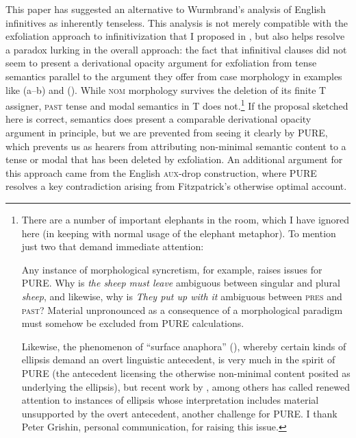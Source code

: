 \documentclass[output=paper]{langscibook}
\begin{document}
This paper has suggested an alternative to Wurmbrand's \citeyearpar{Wurmbrand:2014aa} analysis of English infinitives as inherently tenseless. This analysis is not merely compatible with the exfoliation approach to infinitivization that I proposed in \citet{Pesetsky:2019aa}, but also helps resolve a paradox lurking in the overall approach: the fact that infinitival clauses did not seem to present a derivational opacity argument for exfoliation from tense semantics parallel to the argument they offer from case morphology in examples like (a--b) and (). While \textsc{nom} morphology survives the deletion of its finite T assigner, \textsc{past} tense and modal semantics in T does not.\footnote{There are a number of important elephants in the room, which I have ignored here (in keeping with normal usage of the elephant metaphor). To mention just two that demand immediate attention: 

Any instance of morphological syncretism, for example, raises issues for PURE.  Why is \textit{the sheep must leave} ambiguous between singular and plural \textit{sheep}, and likewise, why is \textit{They put up with it} ambiguous between \textsc{pres} and \textsc{past}? Material unpronounced as a consequence of a morphological paradigm must somehow be excluded from PURE calculations. 


Likewise, the phenomenon of ``surface anaphora'' (\citealt{Hankamer1976a}), whereby certain kinds of ellipsis demand an overt linguistic antecedent, is very much in the spirit of PURE (the antecedent licensing the otherwise non-minimal content posited as underlying the ellipsis), but recent work by \citealt{Rudin:2019aa}, among others has called renewed attention to instances of ellipsis whose interpretation includes material unsupported by the overt antecedent, another challenge for PURE. I thank Peter Grishin, personal communication, for raising this issue.} 
If the proposal sketched here is correct, semantics does present a comparable derivational opacity argument in principle, but we are prevented from seeing it clearly by PURE, which prevents us as hearers from attributing non-minimal semantic content to a tense or modal that has been deleted by exfoliation. An additional argument for this approach came from the English \textsc{aux}-drop construction, where PURE resolves a key contradiction arising from Fitzpatrick's otherwise optimal account.
\end{document}
